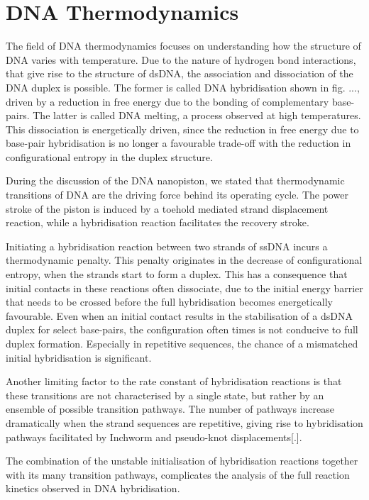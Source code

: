 \section{DNA Thermodynamics}

 The field of DNA thermodynamics focuses on understanding how the structure of DNA varies
with temperature. Due to the nature of hydrogen bond interactions, that give rise to the
structure of dsDNA, the association and dissociation of the DNA duplex is possible. The
former is called DNA hybridisation shown in fig. ..., driven by a reduction in free
energy due to the bonding of complementary base-pairs. The latter is called DNA
melting, a process observed at high temperatures. This dissociation is
energetically driven, since the reduction in free energy due to base-pair hybridisation
is no longer a favourable trade-off with the reduction in configurational entropy in the
duplex structure.

During the discussion of the DNA nanopiston, we stated that thermodynamic transitions of
DNA are the driving force behind its operating cycle. The power stroke of the piston is
induced by a toehold mediated strand displacement reaction, while a hybridisation
reaction facilitates the recovery stroke.

Initiating a hybridisation reaction between two strands of ssDNA incurs a thermodynamic
penalty. This penalty originates in the decrease of configurational entropy, when the
strands start to form a duplex. This has a consequence that initial contacts in these
reactions often dissociate, due to the initial energy barrier that needs to be crossed
before the full hybridisation becomes energetically favourable. Even when an initial
contact
results in the stabilisation of a dsDNA duplex for select base-pairs, the configuration
often times is not conducive to full duplex formation. Especially in repetitive
sequences, the chance of a mismatched initial hybridisation is significant.

Another limiting factor to the rate constant of hybridisation reactions is that these
transitions are not characterised by a single state, but rather by an ensemble of
possible transition pathways. The number of pathways increase dramatically when the
strand sequences are repetitive, giving rise to hybridisation pathways facilitated by
Inchworm and pseudo-knot displacements[.].

The combination of the unstable initialisation of hybridisation reactions together
with its many transition pathways, complicates the analysis of the full reaction kinetics
observed in DNA hybridisation.


